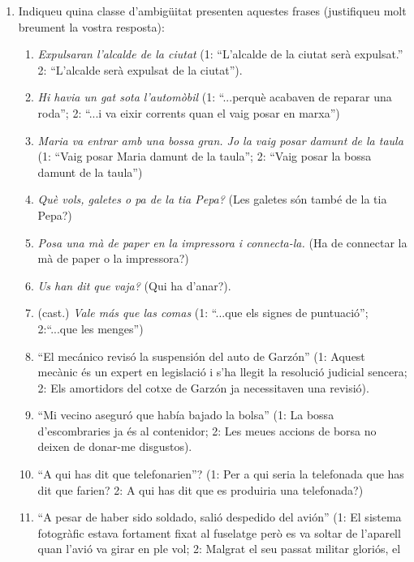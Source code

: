 \begin{enumerate}
\item Indiqueu quina classe d'ambigüitat presenten aquestes
      frases (justifiqueu molt breument la vostra resposta):
      \begin{enumerate}
      \item \emph{Expulsaran l'alcalde de la ciutat} (1:
             ``L'alcalde de la ciutat serà expulsat.'' 
             2: ``L'alcalde serà expulsat de la ciutat'').
      \item \emph{Hi havia un gat sota l'automòbil} (1: ``...perquè
        acabaven de reparar una roda''; 2: ``...i va eixir corrents
        quan el vaig posar en marxa'')
      \item \emph{Maria va entrar amb una bossa gran. Jo la vaig posar damunt de
          la taula} (1: ``Vaig posar Maria damunt de la taula''; 2:
        ``Vaig posar la bossa damunt de la taula'')
      \item \emph{Què vols, galetes o pa de la tia Pepa?} (Les galetes
        són també de la tia Pepa?)
      \item \emph{Posa una mà de paper en la impressora i
          connecta-la.} (Ha de connectar la mà de paper o la
        impressora?)
      \item \emph{Us han dit que vaja?} (Qui ha d'anar?).
      \item (cast.) \emph{Vale más que las comas} (1: ``...que els signes de
        puntuació''; 2:``...que les menges'')
      \item ``El mecánico revisó la suspensión del auto de Garzón''
        (1: Aquest mecànic és un expert en legislació i s'ha llegit
        la resolució judicial sencera; 2: Els amortidors del cotxe de
        Garzón ja necessitaven una revisió). 
      \item ``Mi vecino aseguró que había bajado la bolsa'' (1:
        La bossa d'escombraries ja és al contenidor; 2: Les meues
        accions de borsa no deixen de donar-me disgustos).
      \item ``A qui has dit que telefonarien''?  (1: Per a qui seria
        la telefonada que has dit que farien? 2: A qui has dit que es
        produiria una telefonada?)
      \item ``A pesar de haber sido soldado, salió despedido del
        avión'' (1: El sistema fotogràfic estava fortament fixat al
        fuselatge però es va soltar de l'aparell quan l'avió va girar
        en ple vol; 2: Malgrat el seu passat militar gloriós, el

\end{enumerate}
\end{enumerate}
